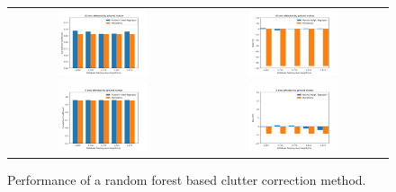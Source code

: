 \documentclass{article}
\begin{document}
\begin{center}
\begin{figure}
\begin{tabular}{cc}
    \includegraphics[width=0.495\textwidth]{Figs/corrCoeff_16bins.png}
    &
    \includegraphics[width=0.495\textwidth]{Figs/bias_16bins.png}\\

    \includegraphics[width=0.495\textwidth]{Figs/corrCoeff_04bins.png}
    &
    \includegraphics[width=0.495\textwidth]{Figs/bias_04bins.png}\\ 
\end{tabular}
\caption{Performance of a random forest based clutter correction method.}
\end{figure}
\end{center}




    
\end{document}
